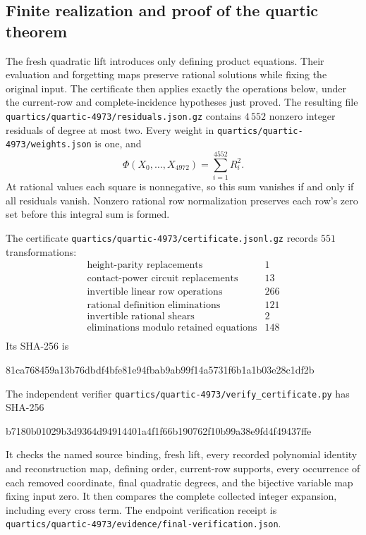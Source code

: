 \subsection{Finite realization and proof of the quartic theorem}
The fresh quadratic lift introduces only defining product equations.
Their evaluation and forgetting maps preserve rational solutions while
fixing the original input. The certificate then applies exactly the
operations below, under the current-row and complete-incidence hypotheses
just proved. The resulting file \nolinkurl{quartics/quartic-4973/residuals.json.gz}
contains $4\,552$ nonzero integer residuals of degree at most two.
Every weight in \nolinkurl{quartics/quartic-4973/weights.json} is one, and
\[
 \Phi(X_0,\ldots,X_{4972})=\sum_{i=1}^{4552}R_i^2.
\]
At rational values each square is nonnegative, so this sum vanishes if and
only if all residuals vanish. Nonzero rational row normalization preserves
each row's zero set before this integral sum is formed.

The certificate \nolinkurl{quartics/quartic-4973/certificate.jsonl.gz} records $551$ transformations:
\[
\begin{array}{lr}
\text{height-parity replacements}&1\\
\text{contact-power circuit replacements}&13\\
\text{invertible linear row operations}&266\\
\text{rational definition eliminations}&121\\
\text{invertible rational shears}&2\\
\text{eliminations modulo retained equations}&148\\
\end{array}
\]
Its SHA-256 is
\begin{center}\footnotesize\ttfamily
81ca768459a13b76dbdf4bfe81e94fbab9ab99f14a5731f6b1a1b03e28c1df2b
\end{center}
The independent verifier \nolinkurl{quartics/quartic-4973/verify_certificate.py} has SHA-256
\begin{center}\footnotesize\ttfamily
b7180b01029b3d9364d94914401a4f1f66b190762f10b99a38e9fd4f49437ffe
\end{center}
It checks the named source binding, fresh lift, every recorded
polynomial identity and reconstruction map, defining order, current-row
supports, every occurrence of each removed coordinate, final quadratic
degrees, and the bijective variable map fixing input zero. It then compares
the complete collected integer expansion, including every cross term.
The endpoint verification receipt is \nolinkurl{quartics/quartic-4973/evidence/final-verification.json}.

